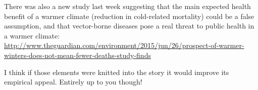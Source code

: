 There was also a new study last week suggesting that the main expected health benefit of a warmer climate (reduction in cold-related mortality) could be a false assumption, and that vector-borne diseases pose a real threat to public health in a warmer climate:
\url{http://www.theguardian.com/environment/2015/jun/26/prospect-of-warmer-winters-does-not-mean-fewer-deaths-study-finds}

I think if those elements were knitted into the story it would improve its empirical appeal. Entirely up to you though!
